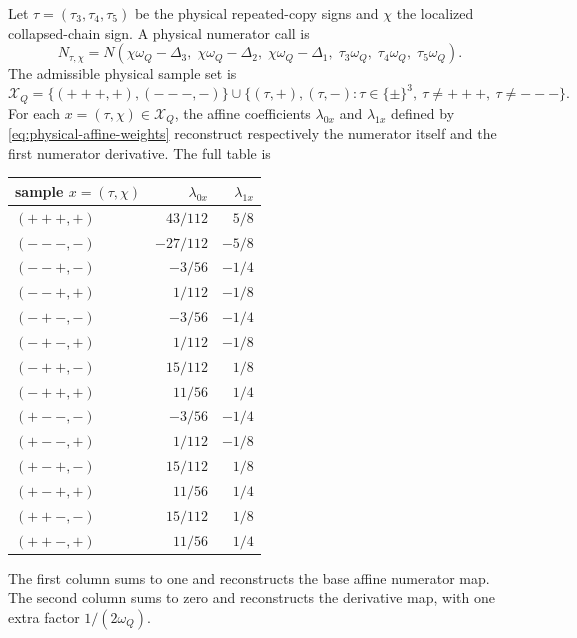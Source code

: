 \documentclass[11pt,a4paper]{report}
\newcommand{\Samples}{\mathcal X}
\begin{document}
Let \(\tau=(\tau_3,\tau_4,\tau_5)\) be the physical repeated-copy signs and
\(\chi\) the localized collapsed-chain sign.  A physical numerator call is
\begin{equation}
  N_{\tau,\chi}
  =
  N\!\left(
    \chi\omega_Q-\Delta_3,\;
    \chi\omega_Q-\Delta_2,\;
    \chi\omega_Q-\Delta_1,\;
    \tau_3\omega_Q,\;
    \tau_4\omega_Q,\;
    \tau_5\omega_Q
  \right).
  \label{eq:box-repeated-samples}
\end{equation}
The admissible physical sample set is
\begin{equation}
  \Samples_Q=
  \{(+++, +), (---,-)\}
  \cup
  \{(\tau,+),(\tau,-):\tau\in\{\pm\}^3,\ \tau\ne+++,\ \tau\ne---\}.
  \label{eq:box-physical-sample-set}
\end{equation}
For each \(x=(\tau,\chi)\in\Samples_Q\), the affine coefficients
\(\lambda_{0x}\) and \(\lambda_{1x}\) defined by
\eqref{eq:physical-affine-weights} reconstruct respectively the numerator
itself and the first numerator derivative.  The full table is
\begin{center}
\begin{tabular}{lrr}
\toprule
sample \(x=(\tau,\chi)\) & \(\lambda_{0x}\) & \(\lambda_{1x}\)\\
\midrule
\((+++,+)\) & \(43/112\) & \(5/8\)\\
\((---,-)\) & \(-27/112\) & \(-5/8\)\\
\((--+,-)\) & \(-3/56\) & \(-1/4\)\\
\((--+,+)\) & \(1/112\) & \(-1/8\)\\
\((-+-,-)\) & \(-3/56\) & \(-1/4\)\\
\((-+-,+)\) & \(1/112\) & \(-1/8\)\\
\((-++,-)\) & \(15/112\) & \(1/8\)\\
\((-++,+)\) & \(11/56\) & \(1/4\)\\
\((+--,-)\) & \(-3/56\) & \(-1/4\)\\
\((+--,+)\) & \(1/112\) & \(-1/8\)\\
\((+-+,-)\) & \(15/112\) & \(1/8\)\\
\((+-+,+)\) & \(11/56\) & \(1/4\)\\
\((++-,-)\) & \(15/112\) & \(1/8\)\\
\((++-,+)\) & \(11/56\) & \(1/4\)\\
\bottomrule
\end{tabular}
\end{center}
The first column sums to one and reconstructs the base affine numerator map.
The second column sums to zero and reconstructs the derivative map, with one
extra factor \(1/(2\omega_Q)\).
\end{document}
